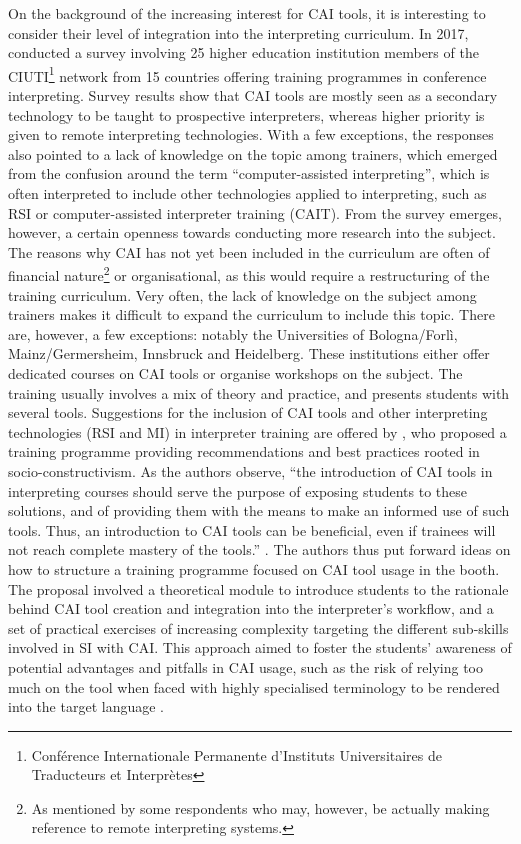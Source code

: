 On the background of the increasing interest for CAI tools, it is interesting to consider their level of integration into the interpreting curriculum. In 2017, \citet{prandi_cai_2020} conducted a survey involving 25 higher education institution members of the CIUTI\footnote{Conférence Internationale Permanente d'Instituts Universitaires de Traducteurs et Interprètes} network from 15 countries offering training programmes in conference interpreting. Survey results show that CAI tools are mostly seen as a secondary technology to be taught to prospective interpreters, whereas higher priority is given to remote interpreting technologies. With a few exceptions, the responses also pointed to a lack of knowledge on the topic among trainers, which emerged from the confusion around the term ``computer-assisted interpreting'', which is often interpreted to include other technologies applied to interpreting, such as RSI or computer-assisted interpreter training (CAIT). From the survey emerges, however, a certain openness towards conducting more research into the subject. The reasons why CAI has not yet been included in the curriculum are often of financial nature\footnote{As mentioned by some respondents who may, however, be actually making reference to remote interpreting systems.} or organisational, as this would require a restructuring of the training curriculum. Very often, the lack of knowledge on the subject among trainers makes it difficult to expand the curriculum to include this topic. There are, however, a few exceptions: notably the Universities of Bologna/Forlì, Mainz/Germersheim, Innsbruck and Heidelberg. These institutions either offer dedicated courses on CAI tools or organise workshops on the subject. The training usually involves a mix of theory and practice, and presents students with several tools. Suggestions for the inclusion of CAI tools and other interpreting technologies (RSI and MI) in interpreter training are offered by \citet{fantinuoli_teaching_2018}, who proposed a training programme providing recommendations and best practices rooted in socio-constructivism. As the authors observe, ``the introduction of CAI tools in interpreting courses should serve the purpose of exposing students to these solutions, and of providing them with the means to make an informed use of such tools. Thus, an introduction to CAI tools can be beneficial, even if trainees will not reach complete mastery of the tools.'' \citep[175]{fantinuoli_teaching_2018}. The authors thus put forward ideas on how to structure a training programme focused on CAI tool usage in the booth. The proposal involved a theoretical module to introduce students to the rationale behind CAI tool creation and integration into the interpreter's workflow, and a set of practical exercises of increasing complexity targeting the different sub-skills involved in SI with CAI. This approach aimed to foster the students' awareness of potential advantages and pitfalls in CAI usage, such as the risk of relying too much on the tool when faced with highly specialised terminology to be rendered into the target language \citep[53]{prandi_use_2015}.

